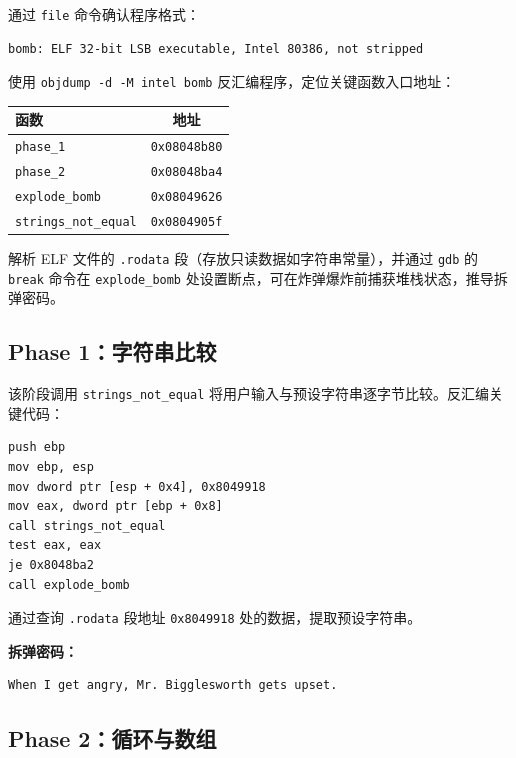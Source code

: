 \documentclass[12pt, a4paper]{academics}
\begin{document}
通过 \texttt{file} 命令确认程序格式：

\begin{verbatim}
bomb: ELF 32-bit LSB executable, Intel 80386, not stripped
\end{verbatim}

使用 \texttt{objdump -d -M intel bomb} 反汇编程序，定位关键函数入口地址：

\begin{center}
\begin{tabular}{|l|c|}
\hline
函数 & 地址 \\
\hline
\texttt{phase_1} & \texttt{0x08048b80} \\
\hline
\texttt{phase_2} & \texttt{0x08048ba4} \\
\hline
\texttt{explode_bomb} & \texttt{0x08049626} \\
\hline
\texttt{strings_not_equal} & \texttt{0x0804905f} \\
\hline
\end{tabular}
\end{center}

解析 ELF 文件的 \texttt{.rodata} 段（存放只读数据如字符串常量），并通过 \texttt{gdb} 的 \texttt{break} 命令在 \texttt{explode_bomb} 处设置断点，可在炸弹爆炸前捕获堆栈状态，推导拆弹密码。

\subsection{Phase 1：字符串比较}

该阶段调用 \texttt{strings_not_equal} 将用户输入与预设字符串逐字节比较。反汇编关键代码：

\begin{verbatim}
push ebp
mov ebp, esp
mov dword ptr [esp + 0x4], 0x8049918
mov eax, dword ptr [ebp + 0x8]
call strings_not_equal
test eax, eax
je 0x8048ba2
call explode_bomb
\end{verbatim}

通过查询 \texttt{.rodata} 段地址 \texttt{0x8049918} 处的数据，提取预设字符串。

\textbf{拆弹密码：}
\begin{verbatim}
When I get angry, Mr. Bigglesworth gets upset.
\end{verbatim}

\subsection{Phase 2：循环与数组}
\end{document}
